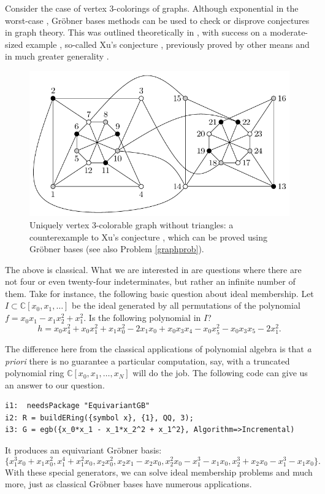 Consider the case of vertex 3-colorings of graphs.  Although exponential in the worst-case \cite[pp. 400]{yap2000fundamental}, Gr\"obner bases methods can be used to check or disprove conjectures in graph theory.  This was outlined theoretically in \cite{bayer1982division}, with success on a moderate-sized example \cite{hillar2008algebraic}, so-called Xu's conjecture \cite{shaoji1990size}, previously proved by other means and in much greater generality \cite{akbari2001kr}.

\begin{figure}
\begin{center}
\includegraphics[width=.8 \linewidth]{akbarigraph.pdf}
\caption{Uniquely vertex 3-colorable graph without triangles: a counterexample \cite{akbari2001kr} to Xu's conjecture \cite{shaoji1990size}, which can be proved using Gr\"obner bases \cite{hillar2008algebraic} (see also Problem \ref{graphprob}).}\label{graph}
\end{center}
\end{figure}
\fi

The above is classical.  What we are interested in are questions where there are not four or even twenty-four indeterminates, but rather an infinite number of them.  Take for instance, the following basic question about ideal membership.  Let $I \subset \mathbb C[x_0,x_1,\ldots]$ be the ideal generated by all permutations of the polynomial $f = x_0 x_1 - x_1 x_2^2 +x_1^2$.  Is the following polynomial in $I$?
\[ h = x_0 x_4^2 + x_0 x_1^2  +x_1 x_0^2 - 2 x_1 x_0 + x_0 x_3 x_4 - x_0 x_5^2 - x_0 x_3 x_5 - 2 x_1^2.\]

The difference here from the classical applications of polynomial algebra is that \textit{a priori} there is no guarantee a particular computation, say, with a truncated polynomial ring $\mathbb C[x_0,x_1,\ldots, x_N]$ will do the job.  The following code can give us an answer to our question.
\begin{M2}
\begin{verbatim}
i1:  needsPackage "EquivariantGB"
i2: R = buildERing({symbol x}, {1}, QQ, 3);
i3: G = egb({x_0*x_1 - x_1*x_2^2 + x_1^2}, Algorithm=>Incremental)
\end{verbatim}
\end{M2}  
It produces an equivariant Gr\"obner basis: $$\{x_1^3 x_0+x_1 x_0^2, x_1^4+x_1^2 x_0, x_2 x_0^2, x_2 x_1-x_2 x_0, x_2^2 x_0-x_1^3-x_1 x_0, x_2^3+x_2 x_0-x_1^3-x_1 x_0\}.$$  
With these special generators, we can solve ideal membership problems and much more, just as classical Gr\"obner bases have numerous applications.  %

